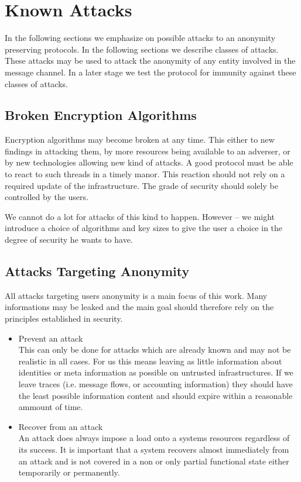 \section{Known Attacks}
In the following sections we emphasize on possible attacks to an anonymity preserving protocols. In the following sections we describe classes of attacks. These attacks may be used to attack the anonymity of any entity involved in the message channel. In a later stage we test the protocol for immunity against these classes of attacks.

\subsection{Broken Encryption Algorithms}
Encryption algorithms may become broken at any time. This either to new findings in attacking them, by more resources being available to an adverser, or by new technologies allowing new kind of attacks. A good protocol must be able to react to such threads in a timely manor. This reaction should not rely on a required update of the infrastructure. The grade of security should solely be controlled by the users. 

We cannot do a lot for attacks of this kind to happen. However -- we might introduce a choice of algorithms and key sizes to give the user a choice in the degree of security he wants to have.

\subsection{Attacks Targeting Anonymity}
All attacks targeting users anonymity is a main focus of this work. Many informations may be leaked and the main goal should therefore rely on the principles established in security.

\begin{itemize}
\item Prevent an attack\\
      This can only be done for attacks which are already known and may not be realistic in all cases. For us this means leaving as little information about identities or meta information as possible on untrusted infrastructures. If we leave traces (i.e. message flows, or accounting information) they should have the least possible information content and should expire within a reasonable ammount of time.
\item Recover from an attack\\
      An attack does always impose a load onto a systems resources regardless of its success. It is important that a system recovers almost immediately from an attack and is not covered in a non or only partial functional state either temporarily or permanently.
\end{itemize}

